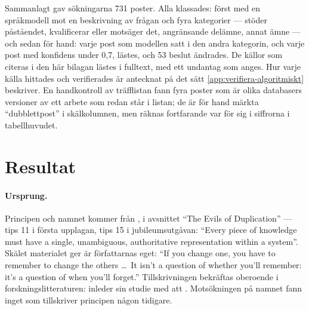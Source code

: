 Sammanlagt gav sökningarna 731 poster.  Alla klassades: först med en
språkmodell mot en beskrivning av frågan och fyra kategorier --- stöder
påståendet, kvalificerar eller motsäger det, angränsande delämne, annat
ämne --- och sedan för hand: varje post som modellen satt i den andra
kategorin, och varje post med konfidens under 0,7, lästes, och 53 beslut
ändrades.  De källor som citeras i den här bilagan lästes i fulltext,
med ett undantag som anges.  Hur varje källa hittades och verifierades
är antecknat på det sätt \cref{app:verifiera-algoritmiskt} beskriver.  En
handkontroll av träfflistan fann fyra poster som är olika databasers
versioner av ett arbete som redan står i listan; de är för hand märkta
\enquote{dubblettpost} i skälkolumnen, men räknas fortfarande var för
sig i siffrorna i tabellhuvudet.

\section{Resultat}
\label{sec:dry-resultat}

\paragraph{Ursprung.}  Principen och namnet kommer från
\textcite{HuntThomas1999}, i avsnittet \enquote{The Evils of
Duplication} --- tips 11 i första upplagan, tips 15 i
jubileumsutgåvan\autocite{ThomasHunt2019}: \enquote{Every piece of
knowledge must have a single, unambiguous, authoritative representation
within a system}.  Skälet materialet ger är författarnas eget:
\enquote{If you change one, you have to remember to change the others
\ldots\ It isn't a question of whether you'll remember: it's a question
of when you'll forget.}  Tillskrivningen bekräftas oberoende i
forskningslitteraturen: \textcite[avsn.~I]{Wagner2016Clones} inleder sin studie
med att .  Motsökningen på
namnet fann inget som tillskriver principen någon tidigare.

